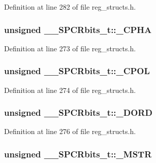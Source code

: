 Definition at line 282 of file reg\+\_\+structs.\+h.

\hypertarget{union_____s_p_c_rbits__t_aa2e70d38a84581304a7ca4e690880c37}{
\subsubsection[{\+\_\+\+C\+P\+H\+A}]{\setlength{\rightskip}{0pt plus 5cm}unsigned \+\_\+\+\_\+\+S\+P\+C\+Rbits\+\_\+t\+::\+\_\+\+C\+P\+H\+A}}\label{union_____s_p_c_rbits__t_aa2e70d38a84581304a7ca4e690880c37}


Definition at line 273 of file reg\+\_\+structs.\+h.

\hypertarget{union_____s_p_c_rbits__t_a097403e851bd5b6a5581e9dbe8110b21}{
\subsubsection[{\+\_\+\+C\+P\+O\+L}]{\setlength{\rightskip}{0pt plus 5cm}unsigned \+\_\+\+\_\+\+S\+P\+C\+Rbits\+\_\+t\+::\+\_\+\+C\+P\+O\+L}}\label{union_____s_p_c_rbits__t_a097403e851bd5b6a5581e9dbe8110b21}


Definition at line 274 of file reg\+\_\+structs.\+h.

\hypertarget{union_____s_p_c_rbits__t_ab537205dda51481136acdc12b6b249f6}{
\subsubsection[{\+\_\+\+D\+O\+R\+D}]{\setlength{\rightskip}{0pt plus 5cm}unsigned \+\_\+\+\_\+\+S\+P\+C\+Rbits\+\_\+t\+::\+\_\+\+D\+O\+R\+D}}\label{union_____s_p_c_rbits__t_ab537205dda51481136acdc12b6b249f6}


Definition at line 276 of file reg\+\_\+structs.\+h.

\hypertarget{union_____s_p_c_rbits__t_ac148c1e4e900c038692e8fab533ee879}{
\subsubsection[{\+\_\+\+M\+S\+T\+R}]{\setlength{\rightskip}{0pt plus 5cm}unsigned \+\_\+\+\_\+\+S\+P\+C\+Rbits\+\_\+t\+::\+\_\+\+M\+S\+T\+R}}\label{union_____s_p_c_rbits__t_ac148c1e4e900c038692e8fab533ee879}


